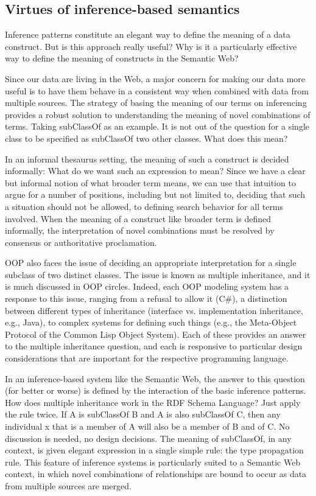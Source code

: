\subsection{Virtues of inference-based semantics}

Inference patterns constitute an elegant way to define the meaning of a
data construct. But is this approach really useful? Why is it a
particularly effective way to define the meaning of constructs in the
Semantic Web?

Since our data are living in the Web, a major concern for making our
data more useful is to have them behave in a consistent way when
combined with data from multiple sources. The strategy of basing the
meaning of our terms on inferencing provides a robust solution to
understanding the meaning of novel combinations of terms. Taking
subClassOf as an example. It is not out of the question for a single
class to be specified as subClassOf two other classes. What does this
mean?

In an informal thesaurus setting, the meaning of such a construct is
decided informally: What do we
want such an expression to mean? Since we have a clear but informal
notion of what broader term means, we can use that intuition to argue
for a number of positions, including but not limited to, deciding that
such a situation should not be allowed, to defining search behavior for
all terms involved. When the meaning of a construct like broader term is
defined informally, the interpretation of novel combinations must be
resolved by consensus or authoritative proclamation.


\begin{sidebar}{}
OOP also faces the issue of deciding an appropriate interpretation for a
single subclass of two distinct classes. The issue is known as multiple
inheritance, and it is much discussed in OOP circles. Indeed, each OOP
modeling system has a response to this issue, ranging from a refusal to
allow it (C\#), a distinction between different types of inheritance
(interface vs. implementation inheritance, e.g., Java), to complex
systems for defining such things (e.g., the Meta-Object Protocol of the
Common Lisp Object System). Each of these provides an answer to the
multiple inheritance question, and each is responsive to particular
design considerations that are important for the respective programming
language.
\end{sidebar}

In an inference-based system like the Semantic Web, the answer to this
question (for better or worse) is defined by the interaction of the
basic inference patterns. How does multiple inheritance work in the RDF
Schema Language? Just apply the rule twice. If A is subClassOf B and A
is also subClassOf C, then any individual x that is a member of A will
also be a member of B and of C. No discussion is needed, no design
decisions. The meaning of subClassOf, in any context, is given elegant
expression in a single simple rule: the type propagation rule. This
feature of inference systems is particularly suited to a Semantic Web
context, in which novel combinations of relationships are bound to occur
as data from multiple sources are merged.

